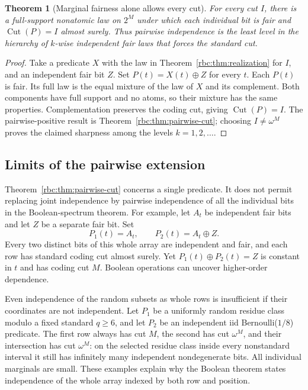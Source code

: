 \documentclass[11pt]{article}
\numberwithin{equation}{section}
\newtheorem{theorem}{Theorem}[section]
\theoremstyle{definition}
\theoremstyle{remark}
\newcommand{\std}{\omega^M}
\newcommand{\Cut}{\operatorname{Cut}}
\begin{document}
\begin{theorem}[Marginal fairness alone allows every cut]
\label{rbc:thm:fair-marginals}
For every cut $I$, there is a full-support nonatomic law on $2^M$ under
which each individual bit is fair and $\Cut(P)=I$ almost surely.
Thus pairwise independence is the least level in the hierarchy of
$k$-wise independent fair laws that forces the standard cut.
\end{theorem}

\begin{proof}
Take a predicate $X$ with the law in Theorem~\ref{rbc:thm:realization} for $I$,
and an independent fair bit $Z$. Set $P(t)=X(t)\mathbin\oplus Z$ for every
$t$. Each $P(t)$ is fair. Its full law is the equal mixture of the law of
$X$ and its complement. Both components have full support and no atoms,
so their mixture has the same properties. Complementation preserves the
coding cut, giving $\Cut(P)=I$. The pairwise-positive result is
Theorem~\ref{rbc:thm:pairwise-cut}; choosing $I\ne\std$ proves the claimed
sharpness among the levels $k=1,2,\ldots$.
\end{proof}

\subsection{Limits of the pairwise extension}

Theorem~\ref{rbc:thm:pairwise-cut} concerns a single predicate. It does not
permit replacing joint independence by pairwise independence of all the
individual bits in the Boolean-spectrum theorem. For example, let $A_t$
be independent fair bits and let $Z$ be a separate fair bit. Set
\[
 P_1(t)=A_t,\qquad P_2(t)=A_t\mathbin\oplus Z.
\]
Every two distinct bits of this whole array are independent and fair,
and each row has standard coding cut almost surely. Yet
$P_1(t)\mathbin\oplus P_2(t)=Z$ is constant in $t$ and has coding cut $M$.
Boolean operations can uncover higher-order dependence.

Even independence of the random subsets as whole rows is insufficient
if their coordinates are not independent. Let $P_1$ be a uniformly random
residue class modulo a fixed standard $q\ge6$, and let $P_2$ be an
independent iid Bernoulli($1/8$) predicate. The first row always has cut
$M$, the second has cut $\std$, and their intersection has cut $\std$:
on the selected residue class inside every nonstandard interval it still
has infinitely many independent nondegenerate bits. All individual
marginals are small. These examples explain why the Boolean theorem
states independence of the whole array indexed by both row and position.
\end{document}
